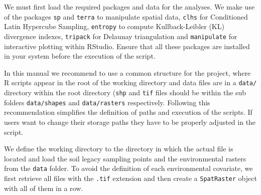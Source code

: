 \documentclass[
]{book}
\newenvironment{Shaded}{\begin{snugshade}}{\end{snugshade}}
\newcommand{\AttributeTok}[1]{\textcolor[rgb]{0.77,0.63,0.00}{#1}}
\newcommand{\CommentTok}[1]{\textcolor[rgb]{0.56,0.35,0.01}{\textit{#1}}}
\newcommand{\ConstantTok}[1]{\textcolor[rgb]{0.00,0.00,0.00}{#1}}
\newcommand{\DocumentationTok}[1]{\textcolor[rgb]{0.56,0.35,0.01}{\textbf{\textit{#1}}}}
\newcommand{\FunctionTok}[1]{\textcolor[rgb]{0.00,0.00,0.00}{#1}}
\newcommand{\NormalTok}[1]{#1}
\newcommand{\OtherTok}[1]{\textcolor[rgb]{0.56,0.35,0.01}{#1}}
\newcommand{\SpecialCharTok}[1]{\textcolor[rgb]{0.00,0.00,0.00}{#1}}
\newcommand{\StringTok}[1]{\textcolor[rgb]{0.31,0.60,0.02}{#1}}
\begin{document}
We must first load the required packages and data for the analyses. We make use of the packages \texttt{sp} and \texttt{terra} to manipulate spatial data, \texttt{clhs} for Conditioned Latin Hypercube Sampling, \texttt{entropy} to compute Kullback-Leibler (KL) divergence indexes, \texttt{tripack} for Delaunay triangulation and \texttt{manipulate} for interactive plotting within RStudio. Ensure that all these packages are installed in your system before the execution of the script.

In this manual we recommend to use a common structure for the project, where R scripts appear in the root of the working directory and data files are in a \texttt{data/} directory within the root directory (\texttt{shp} and \texttt{tif} files should be within the sub folders \texttt{data/shapes} and \texttt{data/rasters} respectively. Following this recommendation simplifies the definition of paths and execution of the scripts. If users want to change their storage paths they have to be properly adjusted in the script.

We define the working directory to the directory in which the actual file is located and load the soil legacy sampling points and the environmental rasters from the \texttt{data} folder. To avoid the definition of each environmental covariate, we first retrieve all files with the \texttt{.tif} extension and then create a \texttt{SpatRaster} object with all of them in a row.

\begin{Shaded}
\end{Shaded}

\begin{Shaded}
\end{Shaded}
\end{document}
